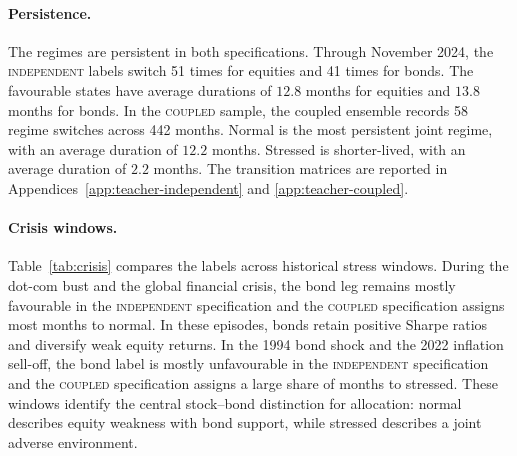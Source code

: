 \documentclass[10pt]{article}
\newcommand{\Acoup}{\textsc{coupled}}
\newcommand{\Bindep}{\textsc{independent}}
\begin{document}
\paragraph{Persistence.}
The regimes are persistent in both specifications. Through November 2024, the \Bindep{}
labels switch 51 times for equities and 41 times for bonds. The favourable states have
average durations of \(12.8\) months for equities and \(13.8\) months for bonds. In the
\Acoup{} sample, the coupled ensemble records 58 regime switches across 442 months. Normal
is the most persistent joint regime, with an average duration of \(12.2\) months. Stressed is
shorter-lived, with an average duration of \(2.2\) months. The transition matrices are
reported in Appendices~\ref{app:teacher-independent} and \ref{app:teacher-coupled}.

\paragraph{Crisis windows.}
Table~\ref{tab:crisis} compares the labels across historical stress windows. During the
dot-com bust and the global financial crisis, the bond leg remains mostly favourable in the
\Bindep{} specification and the \Acoup{} specification assigns most months to normal. In
these episodes, bonds retain positive Sharpe ratios and diversify weak equity returns. In the
1994 bond shock and the 2022 inflation sell-off, the bond label is mostly unfavourable in the
\Bindep{} specification and the \Acoup{} specification assigns a large share of months to
stressed. These windows identify the central stock--bond distinction for allocation: normal
describes equity weakness with bond support, while stressed describes a joint adverse
environment.
\end{document}
